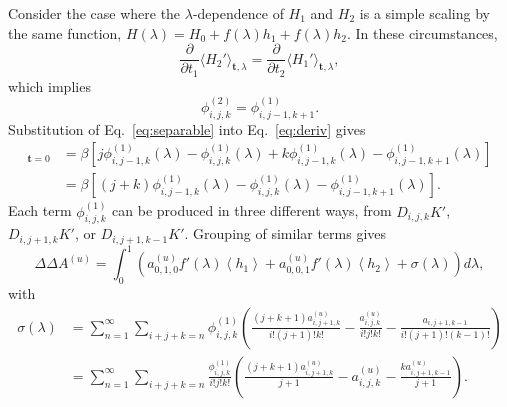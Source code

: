 \documentclass{article}
\let\vec\mathbf
\begin{document}
Consider the case where the $\lambda$-dependence of $H_1$ and $H_2$ is a simple scaling by the same function, $H(\lambda)=H_0 + f(\lambda)h_1 + f(\lambda)h_2$. In these circumstances,
\begin{equation*}
\frac{\partial}{\partial t_1}
	\langle H_2' \rangle_{\vec t, \lambda} = 
\frac{\partial}{\partial t_2}
	\langle H_1' \rangle_{\vec t, \lambda},
\end{equation*}
which implies
\begin{equation}
\phi_{i,j,k}^{(2)} = \phi_{i,j-1,k+1}^{(1)}.
\label{eq:separable}
\end{equation}
Substitution of Eq.~\ref{eq:separable} into Eq.~\ref{eq:deriv} gives
\begin{align}
[D_{i,j,k}K_\lambda']_{\vec t=0} &=
	\beta\left[
		j \phi_{i, j-1, k}^{(1)}(\lambda) -
    	\phi_{i,j,k}^{(1)}(\lambda) +
    	k \phi_{i, j-1, k}^{(1)}(\lambda) -
    	\phi_{i,j-1,k+1}^{(1)}(\lambda)
    \right] \nonumber \\
    &=
	\beta\left[
		(j + k)\phi_{i, j-1, k}^{(1)}(\lambda) -
    	\phi_{i,j,k}^{(1)}(\lambda) -
    	\phi_{i,j-1,k+1}^{(1)}(\lambda)
    \right].
\end{align}
Each term $\phi_{i,j,k}^{(1)}$ can be produced in three different ways, from $D_{i,j,k}K'$, $D_{i,j+1,k}K'$, or $D_{i,j+1,k-1}K'$. Grouping of similar terms gives
\begin{equation}
\Delta\Delta A^{(u)} =
	\int_0^1 \left(
        a_{0,1,0}^{(u)}f'(\lambda)
        \left\langle h_1 \right\rangle +
        a_{0,0,1}^{(u)}f'(\lambda)
        \left\langle h_2 \right\rangle +
        \sigma(\lambda)
    \right) d\lambda,
\end{equation}
with
\begin{align}
\sigma(\lambda) &=
	\sum_{n=1}^{\infty}
    \sum_{i+j+k=n}
        \phi_{i,j,k}^{(1)}\left(
            \frac
                {(j+k+1)a_{i,j+1,k}^{(u)}}
                {i!(j+1)!k!} -
            \frac
                {a_{i,j,k}^{(u)}}
                {i!j!k!} -
            \frac
            	{a_{i,j+1,k-1}}
                {i!(j+1)!(k-1)!}
        \right) \nonumber \\
&=
	\sum_{n=1}^{\infty}
    \sum_{i+j+k=n}
        \frac
        	{\phi_{i,j,k}^{(1)}}
            {i!j!k!}
        \left(
            \frac
                {(j+k+1)a_{i,j+1,k}^{(u)}}
                {j+1} -
            a_{i,j,k}^{(u)} -
           	\frac
            	{k a_{i,j+1,k-1}^{(u)}}
                {j+1}
		\right).
\label{eq:cancel}
\end{align}
\end{document}
